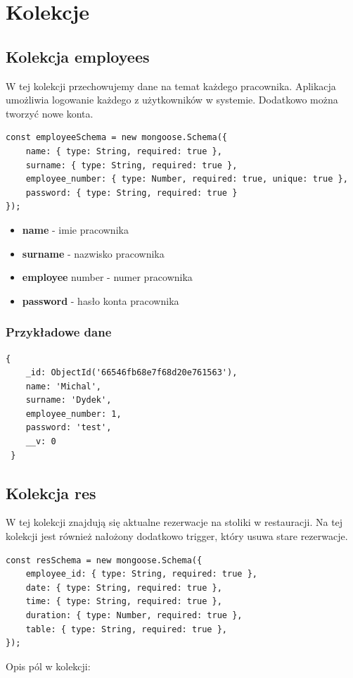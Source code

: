\documentclass[12pt]{article}
\begin{document}
\section{Kolekcje}
\begin{samepage}
\subsection{Kolekcja employees}
W tej kolekcji przechowujemy dane na temat każdego pracownika. Aplikacja umożliwia logowanie każdego z użytkowników w systemie. Dodatkowo można tworzyć nowe konta.
\begin{lstlisting}[caption={Employees}]
const employeeSchema = new mongoose.Schema({
    name: { type: String, required: true },
    surname: { type: String, required: true },
    employee_number: { type: Number, required: true, unique: true },
    password: { type: String, required: true }
});
\end{lstlisting}
\end{samepage}

\begin{itemize}
	\item \textbf{name} - imie pracownika
	\item \textbf{surname} - nazwisko pracownika
	\item \textbf{employee} number - numer pracownika
	\item \textbf{password} - hasło konta pracownika
\end{itemize}

\subsubsection{Przykładowe dane}
\begin{lstlisting}[]
 {
    _id: ObjectId('66546fb68e7f68d20e761563'),
    name: 'Michal',
    surname: 'Dydek',
    employee_number: 1,
    password: 'test',
    __v: 0
 }
\end{lstlisting}


\newpage
\begin{samepage}
\subsection{Kolekcja res}
W tej kolekcji znajdują się aktualne rezerwacje na stoliki w restauracji. Na tej kolekcji jest również nałożony dodatkowo trigger, który usuwa stare rezerwacje.

\begin{lstlisting}[caption={Reservations}]
const resSchema = new mongoose.Schema({
    employee_id: { type: String, required: true },
    date: { type: String, required: true },
    time: { type: String, required: true },
    duration: { type: Number, required: true },
    table: { type: String, required: true },
});
\end{lstlisting}
\end{samepage}
Opis pól w kolekcji:
\end{document}
